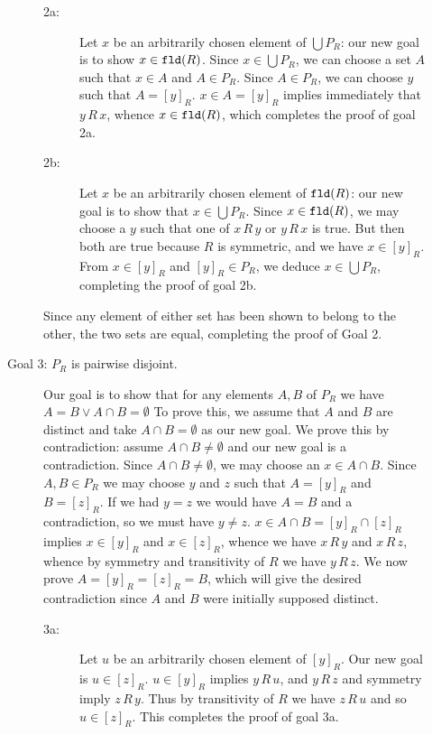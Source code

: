 \documentclass[12pt]{book}
\begin{document}
\begin{description}
\begin{description}
\begin{description}
\item[2a:] Let $x$ be an arbitrarily chosen element of $\bigcup P_R$:
our new goal is to show $x \in {\tt fld}(R)$.  Since $x \in \bigcup
P_R$, we can choose a set $A$ such that $x \in A$ and $A \in P_R$.
Since $A \in P_R$, we can choose $y$ such that $A = [y]_R$.  $x \in A
= [y]_R$ implies immediately that $y \,R\,x$, whence $x \in {\tt
fld}(R)$, which completes the proof of goal 2a.

\item[2b:] Let $x$ be an arbitrarily chosen element of ${\tt fld}(R)$:
our new goal is to show that $x \in \bigcup P_R$.  Since $x \in {\tt
fld}(R)$, we may choose a $y$ such that one of $x \,R\,y$ or $y\,R\,x$
is true.  But then both are true because $R$ is symmetric, and we have
$x \in [y]_R$.  From $x \in [y]_R$ and $[y]_R \in P_R$, we deduce $x
\in \bigcup P_R$, completing the proof of goal 2b.

\end{description}

Since any element of either set has been shown to belong to the other,
the two sets are equal, completing the proof of Goal 2.

\item[Goal 3: $P_R$ is pairwise disjoint.]  Our goal is to show that
for any elements $A,B$ of $P_R$ we have $A=B \vee A \cap B =
\emptyset$ To prove this, we assume that $A$ and $B$ are distinct and
take $A \cap B = \emptyset$ as our new goal.  We prove this by
contradiction: assume $A \cap B \neq \emptyset$ and our new goal is a
contradiction.  Since $A \cap B \neq \emptyset$, we may choose an $x
\in A \cap B$.  Since $A, B \in P_R$ we may choose $y$ and $z$ such
that $A = [y]_R$ and $B = [z]_R$.  If we had $y=z$ we would have $A=B$
and a contradiction, so we must have $y \neq z$.  $x \in A \cap B =
[y]_R \cap [z]_R$ implies $x \in [y]_R$ and $x \in [z]_R$, whence we
have $x\,R\,y$ and $x\,R\,z$, whence by symmetry and transitivity of
$R$ we have $y\,R\,z$.  We now prove $A = [y]_R = [z]_R = B$, which
will give the desired contradiction since $A$ and $B$ were initially
supposed distinct.

\begin{description}
\item[3a:] Let $u$ be an arbitrarily chosen element of $[y]_R$.  Our
new goal is $u \in [z]_R$.  $u \in [y]_R$ implies $y\,R\,u$, and
$y\,R\,z$ and symmetry imply $z \,R\,y$.  Thus by transitivity of $R$
we have $z\,R\,u$ and so $u \in [z]_R$.  This completes the proof of
goal 3a.


\end{description}
\end{description}
\end{description}
\end{document}

